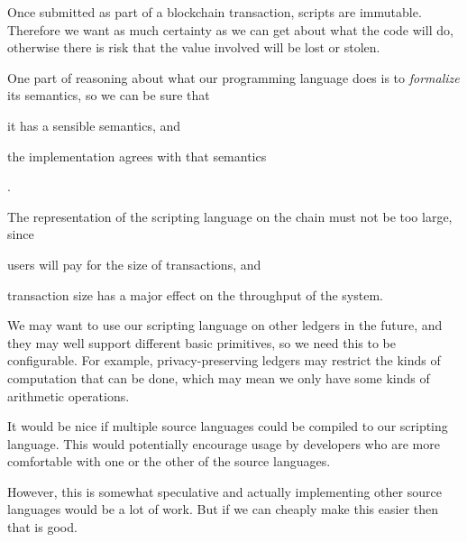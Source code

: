 \begin{requirement}[Safety]
\label{req:script-lang-reasoning}
Once submitted as part of a blockchain transaction, scripts are immutable.
Therefore we want as much certainty as we can get about what the code will do, otherwise there is risk that the value involved will be lost or stolen.
\end{requirement}

\begin{requirement}[Formalization]
\label{req:script-lang-formalization}
One part of reasoning about what our programming language does is to \emph{formalize} its semantics, so we can be sure that
\begin{inparaenum}
  \item it has a sensible semantics, and
  \item the implementation agrees with that semantics
\end{inparaenum}.
\end{requirement}

\begin{requirement}[Size]
\label{req:script-lang-size}
The representation of the scripting language on the chain must not be too large, since
\begin{inparaenum}
\item users will pay for the size of transactions, and
\item transaction size has a major effect on the throughput of the system.
\end{inparaenum}
\end{requirement}

\begin{requirement}[Extensibility]
\label{req:script-lang-extensibility}
We may want to use our scripting language on other ledgers in the future, and they may well support different basic primitives, so we need this to be configurable.
For example, privacy-preserving ledgers may restrict the kinds of computation that can be done, which may mean we only have some kinds of arithmetic operations.
\end{requirement}

\begin{requirement}
\label{req:source-lang-multiple}
It would be nice if multiple source languages could be compiled to our scripting language.
This would potentially encourage usage by developers who are more comfortable with one or the other of the source languages.

However, this is somewhat speculative and actually implementing other source languages would be a lot of work.
But if we can cheaply make this easier then that is good.
\end{requirement}

